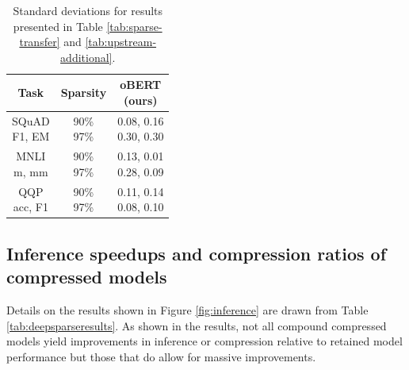 \documentclass[11pt]{article}
\begin{document}
\begin{table}[htb!]
      \centering
            {\small 
                \begin{tabular}{cc|c}
                \toprule 
                Task & Sparsity & \makecell{oBERT \\(ours)} \\
                \midrule
                \makecell{SQuAD \\ F1, EM} & \makecell{90\% \\ 97\%} & \makecell{0.08, 0.16 \\ 0.30, 0.30} \\
                \midrule
                \makecell{MNLI \\ m, mm} & \makecell{90\% \\ 97\%} & \makecell{0.13, 0.01 \\ 0.28, 0.09} \\
                \midrule
                \makecell{QQP \\ acc, F1} & \makecell{90\% \\ 97\%} & \makecell{0.11, 0.14 \\ 0.08, 0.10} \\
                \bottomrule
                \end{tabular}
            }
    \caption{Standard deviations for results presented in Table \ref{tab:sparse-transfer} and \ref{tab:upstream-additional}.}
    \label{tab:sparse-transfer-deviations}
\end{table}

\subsection{Inference speedups and compression ratios of compressed models}
Details on the results shown in Figure \ref{fig:inference} are drawn from Table \ref{tab:deepsparseresults}. As shown in the results, not all compound compressed models yield improvements in inference or compression relative to retained model performance but those that do allow for massive improvements.
\end{document}

